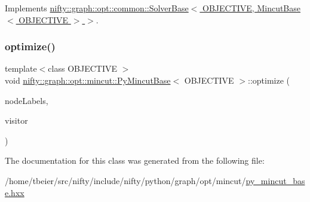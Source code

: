Implements \hyperlink{classnifty_1_1graph_1_1opt_1_1common_1_1SolverBase_a55e9eb645c07d6e0782ebfb990ab3c84}{nifty\+::graph\+::opt\+::common\+::\+Solver\+Base$<$ O\+B\+J\+E\+C\+T\+I\+V\+E, Mincut\+Base$<$ O\+B\+J\+E\+C\+T\+I\+V\+E $>$ $>$}.

\mbox{\label{classnifty_1_1graph_1_1opt_1_1mincut_1_1PyMincutBase_a20e6b88e3ff713ad4bf7787d2b26dcaa}} 
\subsubsection{\texorpdfstring{optimize()}{optimize()}}
{\footnotesize\ttfamily template$<$class O\+B\+J\+E\+C\+T\+I\+VE $>$ \\
void \hyperlink{classnifty_1_1graph_1_1opt_1_1mincut_1_1PyMincutBase}{nifty\+::graph\+::opt\+::mincut\+::\+Py\+Mincut\+Base}$<$ O\+B\+J\+E\+C\+T\+I\+VE $>$\+::optimize (\begin{DoxyParamCaption}\item[{\hyperlink{classnifty_1_1graph_1_1opt_1_1mincut_1_1PyMincutBase_a54c8146f750e7085a430228c3082a0cf}{Node\+Labels\+Type} \&}]{node\+Labels,  }\item[{\hyperlink{classnifty_1_1graph_1_1opt_1_1mincut_1_1PyMincutBase_ab39a6b86f6807f6d1cc2325567bfff6f}{Visitor\+Base\+Type} $\ast$}]{visitor }\end{DoxyParamCaption})\hspace{0.3cm}{\ttfamily [inline]}}



The documentation for this class was generated from the following file\+:\begin{DoxyCompactItemize}
\item 
/home/tbeier/src/nifty/include/nifty/python/graph/opt/mincut/\hyperlink{py__mincut__base_8hxx}{py\+\_\+mincut\+\_\+base.\+hxx}\end{DoxyCompactItemize}
